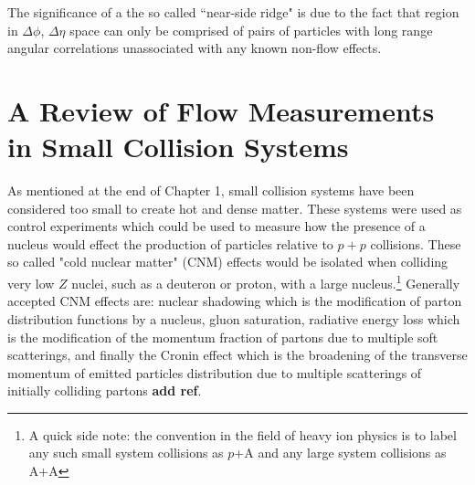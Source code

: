 The significance of a the so called ``near-side ridge" is due to the fact that region in $\Delta\phi$, $\Delta\eta$ space can only be comprised of pairs of particles with long range angular correlations unassociated with any known non-flow effects.

\section{A Review of Flow Measurements in Small Collision Systems}

As mentioned at the end of Chapter 1, small collision systems have been considered too small to create hot and dense matter. These systems were used as control experiments which could be used to measure how the presence of a nucleus would effect the production of particles relative to $p+p$ collisions. These so called "cold nuclear matter" (CNM) effects would be isolated when colliding very low $Z$ nuclei, such as a deuteron or proton, with a large nucleus.\footnote{ A quick side note: the convention in the field of heavy ion physics is to label any such small system collisions as $p$+A and any large system collisions as A+A} Generally accepted CNM effects are: nuclear shadowing which is the modification of parton distribution functions by a nucleus, gluon saturation, radiative energy loss which is the modification of the momentum fraction of partons due to multiple soft scatterings, and finally the Cronin effect which is the broadening of the transverse momentum of emitted particles distribution due to multiple scatterings of initially colliding partons \textbf{add ref}.  

